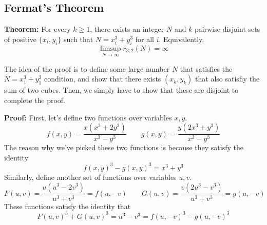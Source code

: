 \subsection{Fermat's Theorem}
\begin{boxedsection}
\textbf{Theorem:} For every $k \geq 1$, there exists an integer $N$ and $k$ pairwise disjoint sets of positive $\{x_i,y_i\}$ such that $N = x_i^3 + y_i^3$ for all $i$. Equivalently,
$$
\limsup_{N\rightarrow \infty} r_{3,2}(N) = \infty
$$
\end{boxedsection}
The idea of the proof is to define some large number $N$ that satisfies the $N = x_1^3 + y_1^3$ condition, and show that there exists $(x_k, y_k)$ that also satisfiy the sum of two cubes. Then, we simply have to show that these are disjoint to complete the proof. 
\begin{boxedsection}
\textbf{Proof:} First, let's define two functions over variables $x,y$.
$$
f(x,y) = \frac{x(x^3 + 2y^3)}{x^3 - y^3} \quad \quad g(x,y) = \frac{y(2x^3 + y^3)}{x^3 - y^3}
$$
The reason why we've picked these two functions is because they satisfy the identity
$$
f(x,y)^3 - g(x,y)^3 = x^3 + y^3
$$
Similarly, define another set of functions over variables $u,v$. 
$$
F(u,v) = \frac{u(u^3 - 2v^3)}{u^3 + v^3} = f(u,-v) \quad \quad G(u,v) = \frac{v(2u^3 - v^3)}{u^3 + v^3} = g(u,-v)
$$
These functions satisfy the identity that
$$
F(u,v)^3 + G(u,v)^3 = u^3 - v^3 = f(u,-v)^3 - g(u,-v)^3 
$$
\end{boxedsection}
\pagebreak
